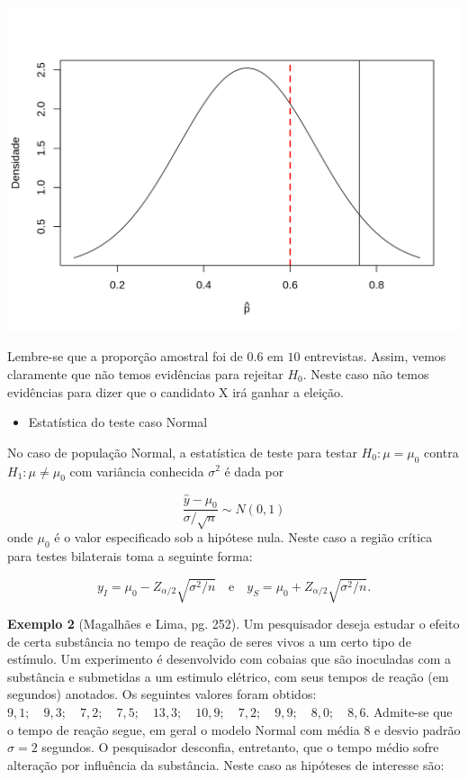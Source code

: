 \documentclass[10pt,a4paper]{book}
\providecommand{\tightlist}{%
  \setlength{\itemsep}{0pt}\setlength{\parskip}{0pt}}
\begin{document}
\begin{center}\includegraphics{figures/unnamed-chunk-390-1} \end{center}

Lembre-se que a proporção amostral foi de \(0.6\) em \(10\) entrevistas.
Assim, vemos claramente que não temos evidências para rejeitar \(H_0\).
Neste caso não temos evidências para dizer que o candidato X irá ganhar
a eleição.

\begin{itemize}
\tightlist
\item
  Estatística do teste caso Normal
\end{itemize}

No caso de população Normal, a estatística de teste para testar
\(H_0:\mu = \mu_0\) contra \(H_1: \mu \neq \mu_0\) com variância
conhecida \(\sigma^2\) é dada por

\[
\frac{\hat{y} -  \mu_0}{\sigma/\sqrt{n}} \sim N(0,1)
\] onde \(\mu_0\) é o valor especificado sob a hipótese nula. Neste caso
a região crítica para testes bilaterais toma a seguinte forma:

\[
y_I = \mu_0 - Z_{\alpha/2} \sqrt{\sigma^2 / n}\quad \text{e} \quad y_S = \mu_0 + Z_{\alpha/2} \sqrt{\sigma^2 / n}.
\]

\textbf{Exemplo 2} (Magalhães e Lima, pg. 252). Um pesquisador deseja
estudar o efeito de certa substância no tempo de reação de seres vivos a
um certo tipo de estímulo. Um experimento é desenvolvido com cobaias que
são inoculadas com a substância e submetidas a um estimulo elétrico, com
seus tempos de reação (em segundos) anotados. Os seguintes valores foram
obtidos:
\(9,1;\quad 9,3;\quad 7,2;\quad 7,5;\quad 13,3;\quad 10,9;\quad 7,2;\quad 9,9;\quad 8,0;\quad 8,6\).
Admite-se que o tempo de reação segue, em geral o modelo Normal com
média 8 e desvio padrão \(\sigma = 2\) segundos. O pesquisador
desconfia, entretanto, que o tempo médio sofre alteração por influência
da substância. Neste caso as hipóteses de interesse são:
\end{document}
